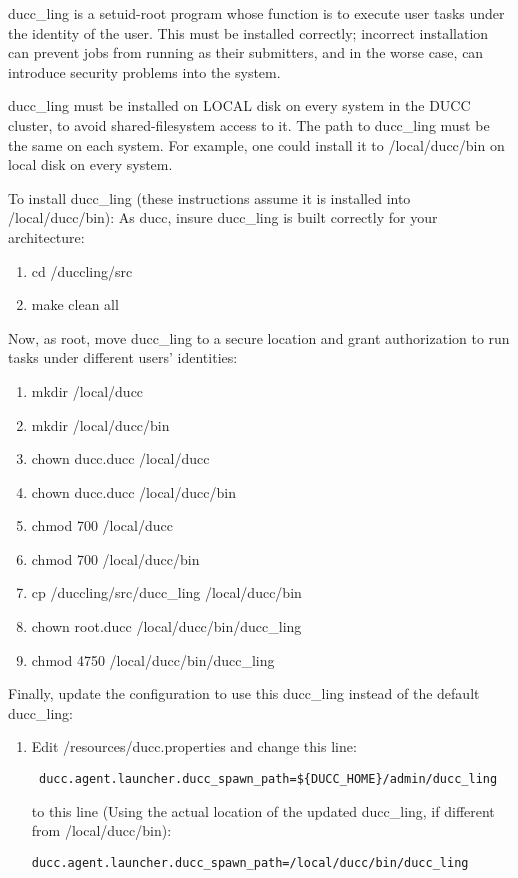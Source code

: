     ducc\_ling is a setuid-root program whose function is to execute user tasks under the identity of
    the user.  This must be installed correctly; incorrect installation can prevent jobs from running as
    their submitters, and in the worse case, can introduce security problems into the system.

    ducc\_ling must be installed on LOCAL disk on every system in the DUCC cluster, to avoid
    shared-filesystem access to it.  The path to ducc\_ling must be the same on each system.  For
    example, one could install it to /local/ducc/bin on local disk on every system.

    To install ducc\_ling (these instructions assume it is installed into /local/ducc/bin):
    As ducc, insure ducc\_ling is built correctly for your architecture:
    \begin{enumerate}
        \item cd \duccruntime/duccling/src
        \item make clean all
     \end{enumerate}
        
     Now, as root, move ducc\_ling to a secure location and grant authorization to run tasks under
     different users' identities:
     \begin{enumerate}
         \item mkdir /local/ducc
         \item mkdir /local/ducc/bin
         \item chown ducc.ducc /local/ducc
         \item chown ducc.ducc /local/ducc/bin
         \item chmod 700 /local/ducc
         \item chmod 700 /local/ducc/bin
         \item cp \duccruntime/duccling/src/ducc\_ling /local/ducc/bin
         \item chown root.ducc /local/ducc/bin/ducc\_ling
         \item chmod 4750 /local/ducc/bin/ducc\_ling
      \end{enumerate}
         
      Finally, update the configuration to use this ducc\_ling instead of the default ducc\_ling:
      \begin{enumerate}
        \item Edit \duccruntime/resources/ducc.properties and change this line:         
\begin{verbatim}
 ducc.agent.launcher.ducc_spawn_path=${DUCC_HOME}/admin/ducc_ling
\end{verbatim}
          to this line (Using the actual location of the updated ducc\_ling, if different from /local/ducc/bin):
\begin{verbatim}
ducc.agent.launcher.ducc_spawn_path=/local/ducc/bin/ducc_ling
\end{verbatim}
        \end{enumerate}


